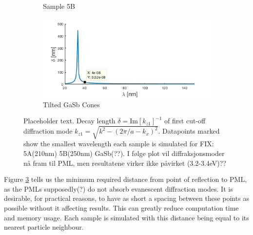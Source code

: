 \begin{figure}
\begin{subfigure}{.5\textwidth}
        \caption{Sample 5B}
        \label{}
    \end{subfigure}
    \begin{subfigure}{.5\textwidth}
        \centering
        \includegraphics[width=\linewidth,trim=0.5cm 0cm 1cm 0cm, clip]{figures/Appendix/DecayLengthOfDiffractedMode_GaSbCones_assumingsquarelattice1.png}
        \caption{Tilted GaSb Cones}
        \label{fig:}
    \end{subfigure}
    \caption{Placeholder text. Decay length $\delta=\text{Im}[k_{z1}]^{-1}$ of first cut-off diffraction mode $k_{z1}=\sqrt{k^2-(2\pi/a-k_x)^2}$. Datapoints marked show the smallest wavelength each sample is simulated for \color{red}FIX: 5A(210nm) 5B(250nm) GaSb(??). I følge plot vil diffraksjonsmoder nå fram til PML, men resultatene virker ikke påvirket (3.2-3.4eV)??}
    \label{fig:Appendix_DecayLength}
\end{figure}
Figure \ref{fig:Appendix_DecayLength} tells us the minimum required distance from point of reflection to PML, as the PMLs supposedly(?) do not absorb evanescent diffraction modes. It is desirable, for practical reasons, to have as short a spacing between these points as possible without it affecting results. This can greatly reduce computation time and memory usage. Each sample is simulated with this distance being equal to its nearest particle neighbour. 

